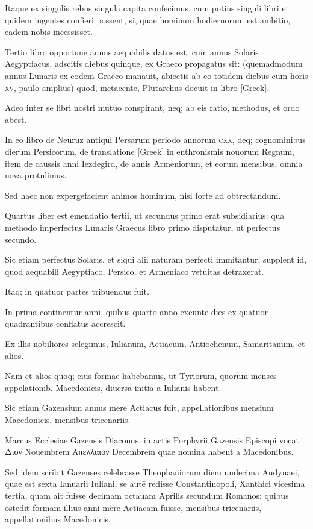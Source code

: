\begin{parnumbers}
Itaque ex singulis rebus singula capita
confecimus, cum potius singuli libri et quidem ingentes confieri
possent, si, quae hominum hodiernorum est ambitio, eadem nobis
incessisset.

Tertio libro opportune annus aequabilis datus est,
cum annus Solaris Aegyptiacus, adscitis diebus quinque, ex Graeco
propagatus sit: (quemadmodum annus Lunaris ex eodem Graeco
manauit, abiectis ab eo totidem diebus cum horis \textsc{xv}, paulo amplius)
quod, metacente, Plutarchus docuit in libro \textgreek{[Greek]}.

Adeo inter se libri nostri mutuo conspirant, neq; ab eis ratio,
methodus, et ordo abest.

In eo libro de Neuruz antiqui Persarum
periodo annorum \textsc{cxx}, deq; cognominibus dierum Persicorum,
de translatione \textgreek{[Greek]} in enthronismis nouorum Regnum,
item de caussis anni Iezdegird, de annis Armeniorum, et eorum
mensibus, omnia nova protulimus. 

Sed haec non expergefacient animos
hominum, nisi forte ad obtrectandum.

Quartus liber est emendatio
tertii, ut secundus primo erat subsidiarius: qua methodo imperfectus
Lunaris Graecus libro primo disputatur, ut perfectus secundo.

Sic etiam perfectus Solaris, et siqui alii naturam perfecti immitantur,
supplent id, quod aequabili Aegyptiaco, Persico, et Armeniaco
vetuitas detraxerat.

Itaq; in quatuor partes tribuendus fuit.

In
prima continentur anni, quibus quarto anno exeunte dies ex quatuor
quadrantibus conflatus accrescit.

Ex illis nobiliores selegimus,
Iulianum, Actiacum, Antiochenum, Samaritanum, et alios. 

Nam et alios quoq; eius formae habebamus, ut Tyriorum, quorum menses
appelationib. Macedonicis, diuersa initia a Iulianis habent.

Sic
etiam Gazensium annus mere Actiacus fuit, appellationibus mensium 
Macedonicis, mensibus tricenariis. 

Marcus Ecclesiae Gazensis Diaconus,
in actis Porphyrii Gazensis Episcopi vocat \textgreek{Διον} Nouembrem
\textgreek{Απελλαιον} Decembrem quae nomina habent a Macedonibus. 

Sed
idem scribit Gazenses celebrasse Theophaniorum diem undecima
Audynaei, quae est sexta Ianuarii Iuliani, se autē redisse Constantinopoli,
Xanthici vicesima tertia, quam ait fuisse decimam octauam
Aprilis secundum Romanos: quibus ostēdit formam illius anni mere
Actiacam fuisse, mensibus tricenariis, appellationibus Macedonicis. 


\end{parnumbers}
